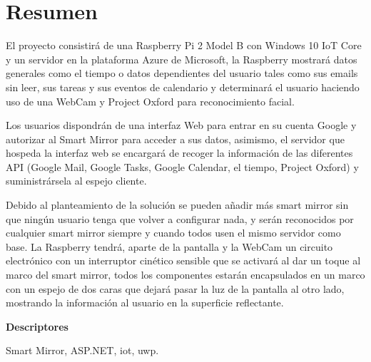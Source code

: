 \chapter*{Resumen}

El proyecto consistirá de una Raspberry Pi 2 Model B con Windows 10 IoT Core y un servidor en la plataforma Azure de Microsoft, la Raspberry mostrará datos generales como el tiempo o datos dependientes del usuario tales como sus emails sin leer, sus tareas y sus eventos de calendario y determinará el usuario haciendo uso de una WebCam y Project Oxford para reconocimiento facial.

Los usuarios dispondrán de una interfaz Web para entrar en su cuenta Google y autorizar al Smart Mirror para acceder a sus datos, asimismo, el servidor que hospeda la interfaz web se encargará de recoger la información de las diferentes API (Google Mail, Google Tasks, Google Calendar, el tiempo, Project Oxford) y suministrársela al espejo cliente.

Debido al planteamiento de la solución se pueden añadir más smart mirror sin que ningún usuario tenga que volver a configurar nada, y serán reconocidos por cualquier smart mirror siempre y cuando todos usen el mismo servidor como base.
La Raspberry tendrá, aparte de la pantalla y la WebCam un circuito electrónico con un interruptor cinético sensible que se activará al dar un toque al marco del smart mirror, todos los componentes estarán encapsulados en un marco con un espejo de dos caras que dejará pasar la luz de la pantalla al otro lado, mostrando la información al usuario en la superficie reflectante.


\vspace{2em}

{\Large\bfseries\sffamily Descriptores}
\vspace{3\medskipamount}

Smart Mirror, ASP.NET, \acrshort{iot}, \acrshort{uwp}.